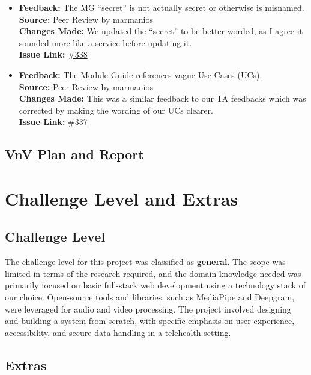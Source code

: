 \documentclass{article}
\begin{document}
\begin{itemize}
    \item 
        \textbf{Feedback:} The MG “secret” is not actually secret or otherwise is misnamed.\\
        \textbf{Source:} Peer Review by marmanios\\
        \textbf{Changes Made:} We updated the “secret” to be better worded, as I agree it sounded more like a service before updating it.\\
        \textbf{Issue Link:} \href{https://github.com/parishanizam/TeleHealth/issues/338}{\#338}
  
    \item 
        \textbf{Feedback:} The Module Guide references vague Use Cases (UCs).\\
        \textbf{Source:} Peer Review by marmanios\\
        \textbf{Changes Made:} This was a similar feedback to our TA feedbacks which was corrected by making the wording of our UCs clearer.\\
        \textbf{Issue Link:} \href{https://github.com/parishanizam/TeleHealth/issues/337}{\#337}

\end{itemize}

\subsection{VnV Plan and Report}

\section{Challenge Level and Extras}

\subsection{Challenge Level}

The challenge level for this project was classified as \textbf{general}. The scope was limited in terms of the research required, and the domain knowledge needed was primarily focused on basic full-stack web development using a technology stack of our choice. 
Open-source tools and libraries, such as MediaPipe and Deepgram, were leveraged for audio and video processing. The project involved designing and building a system from scratch, with specific emphasis on user experience, accessibility, and secure data handling in a telehealth setting.

\subsection{Extras}
\end{document}
